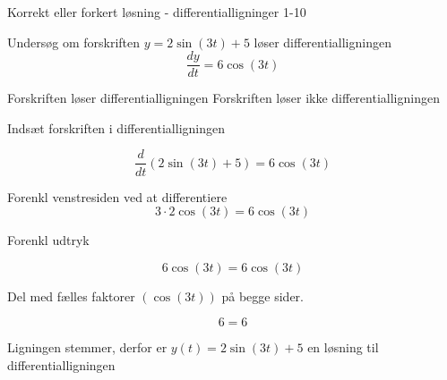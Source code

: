 \documentclass{article}
\begin{document}
\begin{exercise}{Korrekt eller forkert løsning - differentialligninger 1-10}


Undersøg om forskriften $y = 2 \sin(3t) + 5$ løser differentialligningen
\[
\frac{dy}{dt} = 6 \cos(3t)
\]

\begin{multichoice}
\itemtrue Forskriften løser differentialligningen
\itemfalse Forskriften løser ikke differentialligningen
\end{multichoice}

\hint

Indsæt forskriften i differentialligningen

\hint
\[
\frac{d}{dt} \left( 2 \sin(3t) + 5\right) = 6 \cos(3t)
\]


\hint

Forenkl venstresiden ved at differentiere
\[
3\cdot 2 \cos(3t) = 6 \cos(3t)
\]

\hint

Forenkl udtryk

\hint
\[
6 \cos(3t) = 6 \cos(3t)
\]

\hint
Del med fælles faktorer $\left(\cos(3t)\right)$ på begge sider.

\hint

\[
6 = 6
\]


\hint

Ligningen stemmer, derfor er $y(t) = 2 \sin(3t) + 5$ en løsning til differentialligningen

\end{exercise}

\newpage
\end{document}
